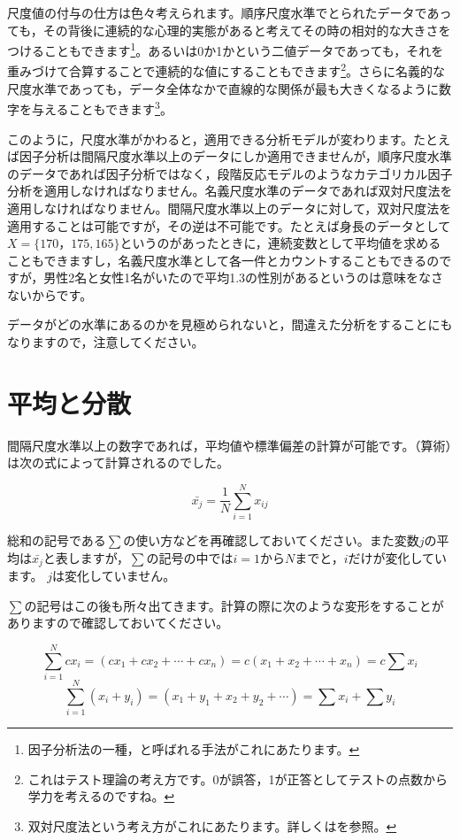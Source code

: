 \documentclass{ltjsbook}
\begin{document}
尺度値の付与の仕方は色々考えられます。順序尺度水準でとられたデータであっても，その背後に連続的な心理的実態があると考えてその時の相対的な大きさをつけることもできます\footnote{因子分析法の一種，と呼ばれる手法がこれにあたります。}。あるいは0か1かという二値データであっても，それを重みづけて合算することで連続的な値にすることもできます\footnote{これはテスト理論の考え方です。0が誤答，1が正答としてテストの点数から学力を考えるのですね。}。さらに名義的な尺度水準であっても，データ全体なかで直線的な関係が最も大きくなるように数字を与えることもできます\footnote{双対尺度法という考え方がこれにあたります。詳しくは\textcite{Nishisato2010}を参照。}。

このように，尺度水準がかわると，適用できる分析モデルが変わります。たとえば因子分析は間隔尺度水準以上のデータにしか適用できませんが，順序尺度水準のデータであれば因子分析ではなく，段階反応モデルのようなカテゴリカル因子分析を適用しなければなりません。名義尺度水準のデータであれば双対尺度法を適用しなければなりません。間隔尺度水準以上のデータに対して，双対尺度法を適用することは可能ですが，その逆は不可能です。たとえば身長のデータとして$X=\{ 170，175, 165 \}$というのがあったときに，連続変数として平均値を求めることもできますし，名義尺度水準として各一件とカウントすることもできるのですが，男性2名と女性1名がいたので平均1.3の性別があるというのは意味をなさないからです。

データがどの水準にあるのかを見極められないと，間違えた分析をすることにもなりますので，注意してください。

\section{平均と分散}
\label{moment}
間隔尺度水準以上の数字であれば，平均値や標準偏差の計算が可能です。（算術）は次の式によって計算されるのでした。

\[  \bar{x_j} = \frac{1}{N} \sum_{i=1}^N x_{ij} \]

総和の記号である$\sum$の使い方などを再確認しておいてください。また変数$j$の平均は$\bar{x_j}$と表しますが，$\sum$の記号の中では$i=1$から$N$までと，$i$だけが変化しています。 $j$は変化していません。

$\sum$の記号はこの後も所々出てきます。計算の際に次のような変形をすることがありますので確認しておいてください。

\[ \sum_{i=1}^N cx_i = (cx_1 + cx_2 + \cdots + cx_n) = c(x_1 + x_2 + \cdots + x_n) =  c\sum x_i \]
\[ \sum_{i=1}^N (x_i + y_i) = (x_1 + y_1 + x_2 + y_2 + \cdots) = \sum x_i + \sum y_i \]
\end{document}
